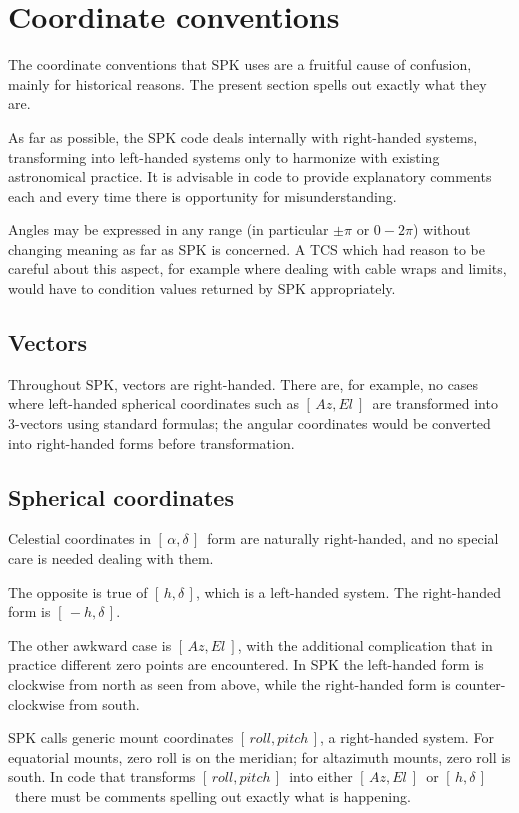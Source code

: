 \documentclass[11pt,fleqn,twoside,\paper]{article}
\renewcommand{\_}{{\tt\char'137}}     %
\newcommand{\radec}     {$[\,\alpha,\delta\,]$}
\newcommand{\hadec}     {$[\,h,\delta\,]$}
\newcommand{\azel}      {$[\,Az,El~]$}
\newcommand{\ropi}      {$[\,roll,pitch\,]$}
\begin{document}

\newpage

\section{Coordinate conventions}
\label{cconv}
The coordinate conventions that SPK uses are a fruitful cause of
confusion, mainly for historical reasons.  The present section
spells out exactly what they are.

As far as possible, the SPK code deals internally with right-handed
systems, transforming into left-handed systems only to harmonize
with existing astronomical practice.  It is advisable in code to
provide explanatory comments each and every time there is opportunity
for misunderstanding.

Angles may be expressed in any range (in particular
$\pm\pi$ or $0-2\pi$) without changing meaning as far as SPK is
concerned.  A TCS which had reason to be careful about this
aspect, for example where dealing with cable wraps and limits,
would have to condition values returned by SPK appropriately.

\subsection{Vectors}
Throughout SPK, vectors are right-handed.  There are, for example,
no cases where left-handed spherical coordinates such as \azel\
are transformed into 3-vectors using standard formulas;  the
angular coordinates would be converted into right-handed forms
before transformation.

\subsection{Spherical coordinates}
Celestial coordinates in \radec\ form are naturally
right-handed, and no special care is needed dealing with them.

The opposite is true of \hadec, which is a left-handed system.
The right-handed form is $[\,-h,\delta\,]$.

The other awkward case is \azel, with the additional complication
that in practice different zero points are encountered.
In SPK the left-handed
form is clockwise from north as seen from above, while the
right-handed form is counter-clockwise from south.

SPK calls generic mount coordinates \ropi, a right-handed system.
For equatorial mounts, zero roll is on the meridian;  for
altazimuth mounts, zero roll is south.  In code that transforms
\ropi\ into either \azel\ or \hadec\ there must be comments
spelling out exactly what is happening.
\end{document}
